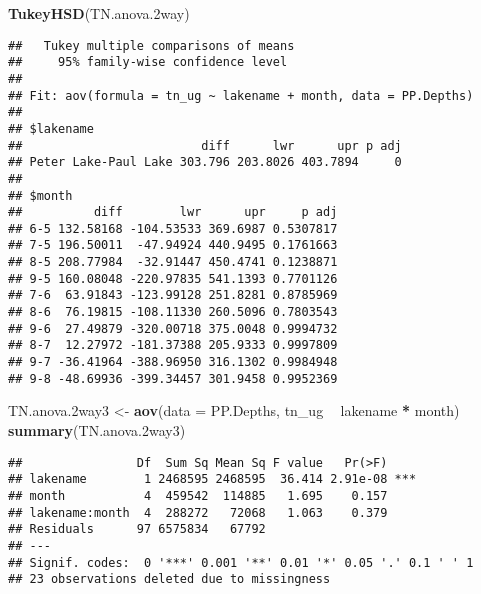 \documentclass[]{article}
\newenvironment{Shaded}{\begin{snugshade}}{\end{snugshade}}
\newcommand{\KeywordTok}[1]{\textcolor[rgb]{0.13,0.29,0.53}{\textbf{#1}}}
\newcommand{\DataTypeTok}[1]{\textcolor[rgb]{0.13,0.29,0.53}{#1}}
\newcommand{\StringTok}[1]{\textcolor[rgb]{0.31,0.60,0.02}{#1}}
\newcommand{\CommentTok}[1]{\textcolor[rgb]{0.56,0.35,0.01}{\textit{#1}}}
\newcommand{\OperatorTok}[1]{\textcolor[rgb]{0.81,0.36,0.00}{\textbf{#1}}}
\newcommand{\NormalTok}[1]{#1}
\begin{document}
\begin{Shaded}
\begin{Highlighting}[]
\KeywordTok{TukeyHSD}\NormalTok{(TN.anova.2way)}
\end{Highlighting}
\end{Shaded}

\begin{verbatim}
##   Tukey multiple comparisons of means
##     95% family-wise confidence level
## 
## Fit: aov(formula = tn_ug ~ lakename + month, data = PP.Depths)
## 
## $lakename
##                         diff      lwr      upr p adj
## Peter Lake-Paul Lake 303.796 203.8026 403.7894     0
## 
## $month
##          diff        lwr      upr     p adj
## 6-5 132.58168 -104.53533 369.6987 0.5307817
## 7-5 196.50011  -47.94924 440.9495 0.1761663
## 8-5 208.77984  -32.91447 450.4741 0.1238871
## 9-5 160.08048 -220.97835 541.1393 0.7701126
## 7-6  63.91843 -123.99128 251.8281 0.8785969
## 8-6  76.19815 -108.11330 260.5096 0.7803543
## 9-6  27.49879 -320.00718 375.0048 0.9994732
## 8-7  12.27972 -181.37388 205.9333 0.9997809
## 9-7 -36.41964 -388.96950 316.1302 0.9984948
## 9-8 -48.69936 -399.34457 301.9458 0.9952369
\end{verbatim}

\begin{Shaded}
\begin{Highlighting}[]
\NormalTok{TN.anova.2way3 <-}\StringTok{ }\KeywordTok{aov}\NormalTok{(}\DataTypeTok{data =}\NormalTok{ PP.Depths, tn_ug }\OperatorTok{~}\StringTok{ }\NormalTok{lakename }\OperatorTok{*}\StringTok{ }\NormalTok{month)}
\KeywordTok{summary}\NormalTok{(TN.anova.2way3)}
\end{Highlighting}
\end{Shaded}

\begin{verbatim}
##                Df  Sum Sq Mean Sq F value   Pr(>F)    
## lakename        1 2468595 2468595  36.414 2.91e-08 ***
## month           4  459542  114885   1.695    0.157    
## lakename:month  4  288272   72068   1.063    0.379    
## Residuals      97 6575834   67792                     
## ---
## Signif. codes:  0 '***' 0.001 '**' 0.01 '*' 0.05 '.' 0.1 ' ' 1
## 23 observations deleted due to missingness
\end{verbatim}

\begin{Shaded}
\end{Shaded}
\end{document}
